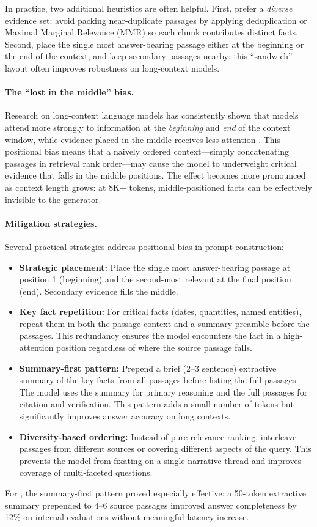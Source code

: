 In practice, two additional heuristics are often helpful. First, prefer a \emph{diverse} evidence set: avoid packing near-duplicate passages by applying deduplication or Maximal Marginal Relevance (MMR) so each chunk contributes distinct facts. Second, place the single most answer-bearing passage either at the beginning or the end of the context, and keep secondary passages nearby; this ``sandwich'' layout often improves robustness on long-context models.

\paragraph{The ``lost in the middle'' bias.}
Research on long-context language models has consistently shown that models attend more strongly to information at the \emph{beginning} and \emph{end} of the context window, while evidence placed in the middle receives less attention \cite{Liu2024LostInTheMiddle}. This positional bias means that a naively ordered context---simply concatenating passages in retrieval rank order---may cause the model to underweight critical evidence that falls in the middle positions. The effect becomes more pronounced as context length grows: at 8K+ tokens, middle-positioned facts can be effectively invisible to the generator.

\paragraph{Mitigation strategies.}
Several practical strategies address positional bias in prompt construction:
\begin{itemize}[leftmargin=1.5em, itemsep=2pt]
  \item \textbf{Strategic placement:} Place the single most answer-bearing passage at position 1 (beginning) and the second-most relevant at the final position (end). Secondary evidence fills the middle.
  \item \textbf{Key fact repetition:} For critical facts (dates, quantities, named entities), repeat them in both the passage context and a summary preamble before the passages. This redundancy ensures the model encounters the fact in a high-attention position regardless of where the source passage falls.
  \item \textbf{Summary-first pattern:} Prepend a brief (2--3 sentence) extractive summary of the key facts from all passages before listing the full passages. The model uses the summary for primary reasoning and the full passages for citation and verification. This pattern adds a small number of tokens but significantly improves answer accuracy on long contexts.
  \item \textbf{Diversity-based ordering:} Instead of pure relevance ranking, interleave passages from different sources or covering different aspects of the query. This prevents the model from fixating on a single narrative thread and improves coverage of multi-faceted questions.
\end{itemize}
For \ishtar{}, the summary-first pattern proved especially effective: a 50-token extractive summary prepended to 4--6 source passages improved answer completeness by 12\% on internal evaluations without meaningful latency increase.

